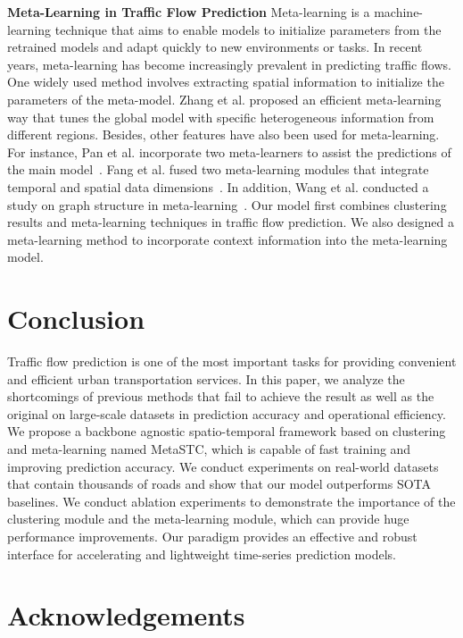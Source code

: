 \documentclass[lettersize,journal]{IEEEtran}
\begin{document}
\textbf{Meta-Learning in Traffic Flow Prediction}
Meta-learning is a machine-learning technique that aims to enable models to initialize parameters from the retrained models and adapt quickly to new environments or tasks. In recent years, meta-learning has become increasingly prevalent in predicting traffic flows. One widely used method involves extracting spatial information to initialize the parameters of the meta-model. Zhang et al. proposed an efficient meta-learning way that tunes the global model with specific heterogeneous information from different regions\cite{zhang_efficient_2022}. Besides, other features have also been used for meta-learning. For instance, Pan et al. incorporate two meta-learners to assist the predictions of the main model~\cite{pan_urban_2019}. Fang et al. fused two meta-learning modules that integrate temporal and spatial data dimensions~\cite{fang_meta-msnet_2021}. In addition, Wang et al. conducted a study on graph structure in meta-learning~\cite{wang_deep_2022}. Our model first combines clustering results and meta-learning techniques in traffic flow prediction. We also designed a meta-learning method to incorporate context information into the meta-learning model.

\section{Conclusion}

Traffic flow prediction is one of the most important tasks for providing convenient and efficient urban transportation services. In this paper, we analyze the shortcomings of previous methods that fail to achieve the result as well as the original on large-scale datasets in prediction accuracy and operational efficiency. We propose a backbone agnostic spatio-temporal framework based on clustering and meta-learning named MetaSTC, which is capable of fast training and improving prediction accuracy. We conduct experiments on real-world datasets that contain thousands of roads and show that our model outperforms SOTA baselines. We conduct ablation experiments to demonstrate the importance of the clustering module and the meta-learning module, which can provide huge performance improvements. Our paradigm provides an effective and robust interface for accelerating and lightweight time-series prediction models.

\section{Acknowledgements}
\end{document}
